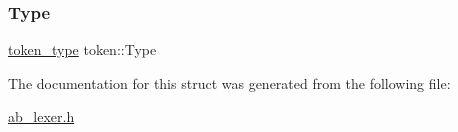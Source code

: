 \mbox{\label{structtoken_a82914c351900753f626fa2d6fcb12fde}} 
\subsubsection{\texorpdfstring{Type}{Type}}
{\footnotesize\ttfamily \hyperlink{ab__lexer_8h_afe5ef662303b6b710ea6ee1a944bad0d}{token\+\_\+type} token\+::\+Type}



The documentation for this struct was generated from the following file\+:\begin{DoxyCompactItemize}
\item 
\hyperlink{ab__lexer_8h}{ab\+\_\+lexer.\+h}\end{DoxyCompactItemize}
